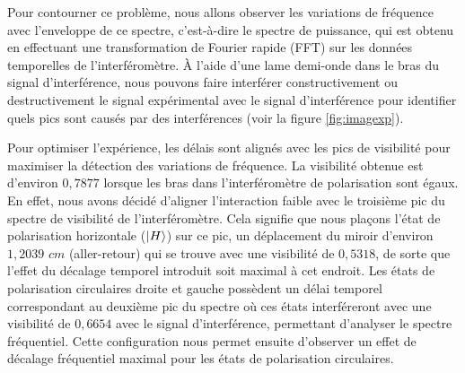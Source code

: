 \begin{onehalfspace}
    \noindent Pour contourner ce problème, nous
    allons observer les variations de fréquence avec l'enveloppe
    de ce spectre, c'est-à-dire le spectre de puissance, qui est
    obtenu en effectuant une transformation de Fourier rapide (FFT)
    sur les données temporelles de l’interféromètre.
    À l'aide d'une lame demi-onde dans le bras du signal d'interférence, 
    nous pouvons faire interférer constructivement ou destructivement
    le signal expérimental avec le signal d'interférence pour identifier
    quels pics sont causés par des interférences (voir la figure \ref{fig:imagexp}).

     
    
    

    


    \noindent Pour optimiser l'expérience, les délais sont alignés avec les pics
    de visibilité pour maximiser la détection des variations de fréquence. 
    La visibilité obtenue est d'environ $0,7877$ lorsque les 
    bras dans l'interféromètre de polarisation sont égaux. 
    En effet, nous avons décidé d’aligner l’interaction faible avec le
    troisième pic du spectre de visibilité de l’interféromètre. Cela
    signifie que nous plaçons l’état de polarisation horizontale
    ($\ket{H}$) sur ce pic, un déplacement du miroir d'environ
    $1,2039$ $cm$ (aller-retour) qui se trouve avec 
    une visibilité de $0,5318$, de sorte que l’effet du décalage temporel
    introduit soit maximal à cet endroit. Les états de
    polarisation circulaires droite et gauche possèdent un délai temporel 
    correspondant au deuxième pic du spectre où ces états interféreront avec 
    une visibilité de $0,6654$ avec le signal d'interférence, permettant 
    d'analyser le spectre fréquentiel. Cette configuration nous permet 
    ensuite d’observer un effet de décalage fréquentiel maximal pour
    les états de polarisation circulaires. 


\end{onehalfspace}

